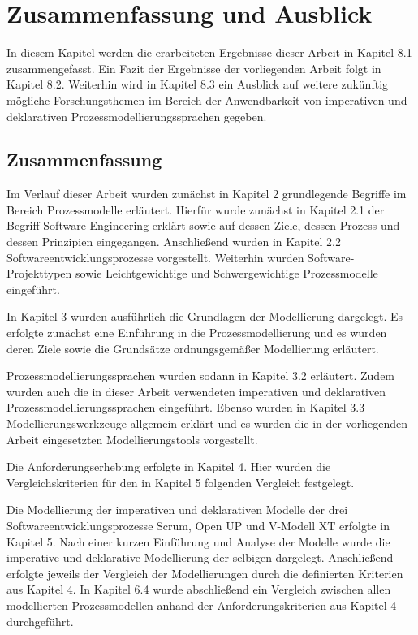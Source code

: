 \chapter{Zusammenfassung und Ausblick}\label{sec:chapter8}
 In diesem Kapitel werden die erarbeiteten Ergebnisse dieser Arbeit in Kapitel 8.1 zusammengefasst. Ein Fazit der Ergebnisse der vorliegenden Arbeit folgt in Kapitel 8.2. Weiterhin wird in Kapitel 8.3 ein Ausblick auf weitere zukünftig mögliche Forschungsthemen im Bereich der Anwendbarkeit von imperativen und deklarativen Prozessmodellierungssprachen gegeben.

\section{Zusammenfassung}

Im Verlauf dieser Arbeit wurden zunächst in Kapitel 2 grundlegende Begriffe im Bereich Prozessmodelle erläutert. Hierfür wurde zunächst in Kapitel 2.1 der Begriff Software Engineering erklärt sowie auf dessen Ziele, dessen Prozess und dessen Prinzipien eingegangen.\newline
Anschließend wurden in Kapitel 2.2 Softwareentwicklungsprozesse vorgestellt. Weiterhin wurden Software-Projekttypen sowie Leichtgewichtige und Schwergewichtige Prozessmodelle eingeführt.\newline

In Kapitel 3 wurden ausführlich die Grundlagen der Modellierung dargelegt. Es erfolgte zunächst eine Einführung in die Prozessmodellierung und es wurden deren Ziele sowie die Grundsätze ordnungsgemäßer Modellierung erläutert.\newline

Prozessmodellierungssprachen wurden sodann in Kapitel 3.2 erläutert. Zudem wurden auch die in dieser Arbeit verwendeten imperativen und deklarativen Prozessmodellierungssprachen eingeführt.\newline
Ebenso wurden in Kapitel 3.3 Modellierungswerkzeuge allgemein erklärt und es wurden die in der vorliegenden Arbeit eingesetzten Modellierungstools vorgestellt.\newline

Die Anforderungserhebung erfolgte in Kapitel 4. Hier wurden die Vergleichskriterien für den in Kapitel 5 folgenden Vergleich  festgelegt.\newline

Die Modellierung der imperativen und deklarativen Modelle der drei Softwareentwicklungsprozesse Scrum, Open UP und V-Modell XT erfolgte in Kapitel 5. Nach einer kurzen Einführung und Analyse der Modelle wurde die imperative und deklarative Modellierung der selbigen dargelegt. Anschließend erfolgte jeweils der Vergleich der Modellierungen durch die definierten Kriterien aus Kapitel 4. In Kapitel 6.4 wurde abschließend ein Vergleich zwischen allen modellierten Prozessmodellen anhand der Anforderungskriterien aus Kapitel 4 durchgeführt. \newline

